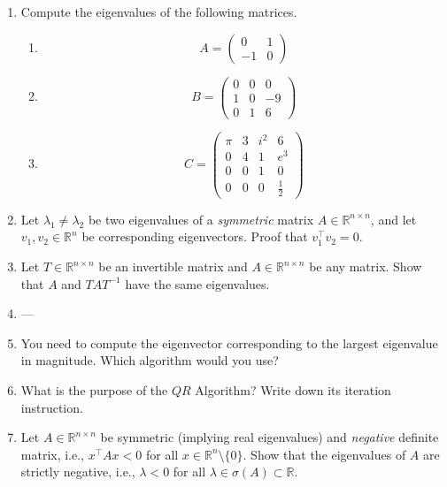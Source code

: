 \begin{enumerate}
		\item Compute the eigenvalues of the following matrices. %
	\begin{enumerate}
		\item $$
		A = \begin{pmatrix}
		0&1\\
		-1&0
		\end{pmatrix}
		$$
		\item
		$$
		B = \begin{pmatrix}
		0&0&0\\
		1&0&-9\\
		0&1&6
		\end{pmatrix}
		$$
		\item $$
		C = \begin{pmatrix}
		\pi& 3& i^2& 6\\
		0 & 4& 1  & e^3\\
		0 & 0& 1  & 0\\
		0 & 0& 0  & \frac{1}{2}
		\end{pmatrix}
		$$
	\end{enumerate}
	\item Let $\lambda_1 \neq \lambda_2$ be two eigenvalues of a \textit{symmetric} matrix $A \in \mathbb{R}^{n \times n}$, and let 
	$v_1, v_2 \in \mathbb{R}^n$ be corresponding eigenvectors. Proof that $v_1^\top v_2 = 0$. 
	 \item Let $T \in \mathbb{R}^{n \times n}$ be an invertible matrix and $A \in \mathbb{R}^{n \times n}$ be any matrix. Show that $A$ and $T A T^{-1}$ have the same eigenvalues.

\item ---
\item You need to compute the eigenvector corresponding to the largest eigenvalue in magnitude. Which algorithm would you use?
\item What is the purpose of the $QR$ Algorithm? Write down its iteration instruction.
\item Let $A \in \mathbb{R}^{n \times n}$ be symmetric (implying real eigenvalues) and \textit{negative} definite matrix, i.e., $x^\top A x < 0$ for all $x \in \mathbb{R}^{n}\setminus \{0\}$. Show that the eigenvalues of $A$ are strictly negative, i.e., $\lambda < 0 $ for all $\lambda \in \sigma(A) \subset \mathbb{R}$.


\end{enumerate}
